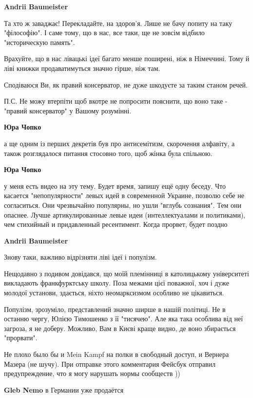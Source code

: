 \begin{itemize}
\begin{itemize}
\textbf{Andrii Baumeister} 

Та хто ж заваджає! Перекладайте, на здоров'я. Лише не бачу попиту на таку
"філософію". І саме тому, що в нас, все таки, ще не зовсім відбило
"историческую память".

Врахуйте, що в нас лівацькі ідеї багато менше поширені, ніж в Німеччині. Тому й
ліві книжки продаватимуться значно гірше, ніж там.

Сподіваюся Ви, як правий консерватор, не дуже шкодуєте за таким станом речей.

П.С. Не можу втерпіти щоб вкотре не попросити пояснити, що воно таке - "правий
консерватор" у Вашому розумінні.

\textbf{Юра Чопко} 

а ще одним із перших декретів був про антисемітизм, скорочення алфавіту, а
також розглядалося питання стосовно того, щоб жінка була спільною.

\textbf{Юра Чопко} 

у меня есть видео на эту тему. Будет время, запишу ещё одну беседу. Что
касается "непопулярности" левых идей в современной Украине, позволю себе не
согласиться. Они чрезвычайно популярны, но ушли "вглубь сознания". Тем они
опаснее. Лучше артикулированные левые идеи (интеллектуалами и политиками), чем
стихийный и придавленный ресентимент. Когда прорвет, будет поздно


\textbf{Andrii Baumeister} 

Знову таки, важливо відрізняти ліві ідеї і популізм.

Нещодавно з подивом довідався, що моїй племінниці в католицькому університеті
викладають франкфурктську школу. Поза межами цієї поважної, хоч і дуже молодої
установи, здається, ніхто неомарксизмом особливо не цікавиться.

Популізм, зрозуміло, представлений значно ширше в нашій політиці. Не в останню
чергу, Юлією Тимошенко з її "тисячею". Але яка така особлива від неї загроза, я
не доберу. Можливо, Вам в Києві краще видно, де воно збирається "прорвати".

\end{itemize} %


Не плохо было бы и Mein Kampf на полки в свободный доступ, и Вернера Мазера (не
шучу). При отправке этого комментария Фейсбук отправил предупреждение, что я
могу нарушать нормы сообществ ))

\begin{itemize} %
\textbf{Gleb Nemo} в Германии уже продаётся
\end{itemize} %


\end{itemize}
